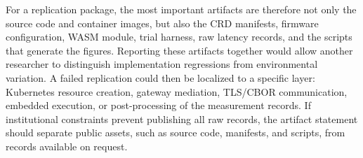 \begingroup
\color{red}
For a replication package, the most important artifacts are therefore not only the source code and container images, but also the CRD manifests, firmware configuration, WASM module, trial harness, raw latency records, and the scripts that generate the figures. Reporting these artifacts together would allow another researcher to distinguish implementation regressions from environmental variation. A failed replication could then be localized to a specific layer: Kubernetes resource creation, gateway mediation, TLS/CBOR communication, embedded execution, or post-processing of the measurement records. {\color{red}If institutional constraints prevent publishing all raw records, the artifact statement should separate public assets, such as source code, manifests, and scripts, from records available on request.}
\endgroup
